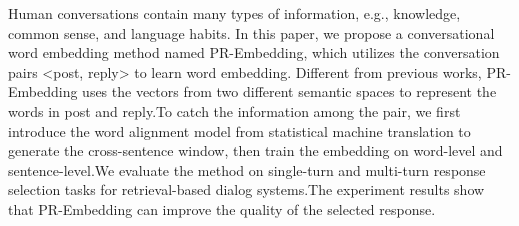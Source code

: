 Human conversations contain many types of information, e.g., knowledge, common sense, and language habits. In this paper, we propose a conversational word embedding method named PR-Embedding, which utilizes the conversation pairs <post, reply>  to learn word embedding. Different from previous works, PR-Embedding uses the vectors from two different semantic spaces to represent the words in post and reply.To catch the information among the pair, we first introduce the word alignment model from statistical machine translation to generate the cross-sentence window, then train the embedding on word-level and sentence-level.We evaluate the method on single-turn and multi-turn response selection tasks for retrieval-based dialog systems.The experiment results show that PR-Embedding can improve the quality of the selected response.

